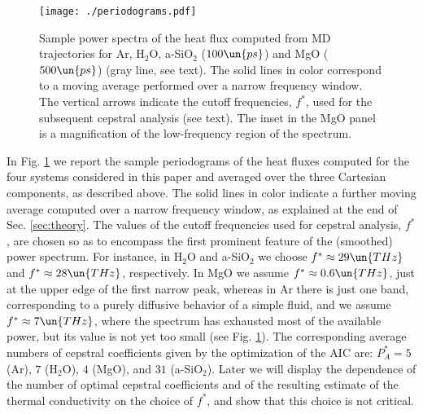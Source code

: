 \begin{figure}[!htb]
\centering
\texttt{[image: ./periodograms.pdf]}
\caption{Sample power spectra of the heat flux computed from MD trajectories for Ar, H$_2$O, a-SiO$_2$ ($100\un{ps}$) and MgO ($500\un{ps}$) (gray line, see text). The solid lines in color correspond to a moving average performed over a narrow frequency window. The vertical arrows indicate the cutoff frequencies, $f^*$, used for the subsequent cepstral analysis (see text). The inset in the MgO panel is a magnification of the low-frequency region of the spectrum.}
\label{fig:periodograms}
\end{figure}

In Fig. \ref{fig:periodograms} we report the sample periodograms of the heat fluxes computed for the four systems considered in this paper and averaged over the three Cartesian components, as described above. The solid lines in color indicate a further moving average \cite{MovingAverage} computed over a narrow frequency window, as explained at the end of Sec. \ref{sec:theory}. The values of the cutoff frequencies used for cepstral analysis, $f^*$, are chosen so as to encompass the first prominent feature of the (smoothed) power spectrum. For instance, in H$_2$O and a-SiO$_2$ we choose $f^*\approx 29\un{THz}$ and $f^*\approx 28\un{THz}$, respectively. In MgO we assume $f^*\approx 0.6\un{THz}$, just at the upper edge of the first narrow peak, whereas in Ar there is just one band, corresponding to a purely diffusive behavior of a simple fluid, and we assume $f^*\approx 7\un{THz}$, where the spectrum has exhausted most of the available power, but its value is not yet too small (see Fig. \ref{fig:periodograms}). The corresponding average numbers of cepstral coefficients given by the optimization of the AIC are: $P_A^*=5$ (Ar), $7$ (H$_2$O), $4$ (MgO), and $31$ (a-SiO$_2$). Later we will display the dependence of the number of optimal cepstral coefficients and of the resulting estimate of the thermal conductivity on the choice of $f^*$, and show that this choice is not critical.

